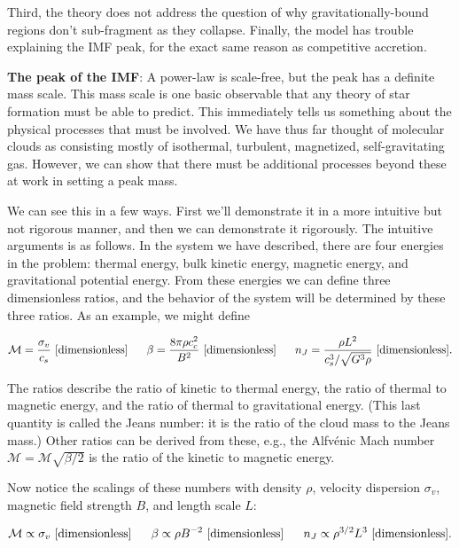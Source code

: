 \documentclass[a4paper,10pt]{article}
\begin{document}
{\noindent}Third, the theory does not address the question of why gravitationally-bound regions don’t sub-fragment as they collapse. Finally, the model has trouble explaining the IMF peak, for the exact same reason as competitive accretion.

{\noindent}\textbf{The peak of the IMF}: A power-law is scale-free, but the peak has a definite mass scale. This mass scale is one basic observable that any theory of star formation must be able to predict. This immediately tells us something about the physical processes that must be involved. We have thus far thought of molecular clouds as consisting mostly of isothermal, turbulent, magnetized, self-gravitating gas. However, we can show that there must be additional processes beyond these at work in setting a peak mass.

{\noindent}We can see this in a few ways. First we'll demonstrate it in a more intuitive but not rigorous manner, and then we can demonstrate it rigorously. The intuitive arguments is as follows. In the system we have described, there are four energies in the problem: thermal energy, bulk kinetic energy, magnetic energy, and gravitational potential energy. From these energies we can define three dimensionless ratios, and the behavior of the system will be determined by these three ratios. As an example, we might define

\begin{align*}
    \mathcal{M}=\frac{\sigma_v}{c_s} ~ [{\rm dimensionless}] ~~~~~ \beta=\frac{8\pi\rho c_c^2}{B^2} ~ [{\rm dimensionless}] ~~~~~ n_J=\frac{\rho L^2}{c_s^3/\sqrt{G^3\rho}} ~ [{\rm dimensionless}].
\end{align*}

{\noindent}The ratios describe the ratio of kinetic to thermal energy, the ratio of thermal to magnetic energy, and the ratio of thermal to gravitational energy. (This last quantity is called the Jeans number: it is the ratio of the cloud mass to the Jeans mass.) Other ratios can be derived from these, e.g., the Alfv\'enic Mach number $\mathcal{M}=\mathcal{M}\sqrt{\beta/2}$ is the ratio of the kinetic to magnetic energy.

{\noindent}Now notice the scalings of these numbers with density $\rho$, velocity dispersion $\sigma_v$, magnetic field strength $B$, and length scale $L$:

\begin{align*}
    \mathcal{M}\propto\sigma_v ~ [{\rm dimensionless}] ~~~~~ \beta\propto\rho B^{-2} ~ [{\rm dimensionless}] ~~~~~ n_J\propto\rho^{3/2}L^3 ~ [{\rm dimensionless}].
\end{align*}
\end{document}
